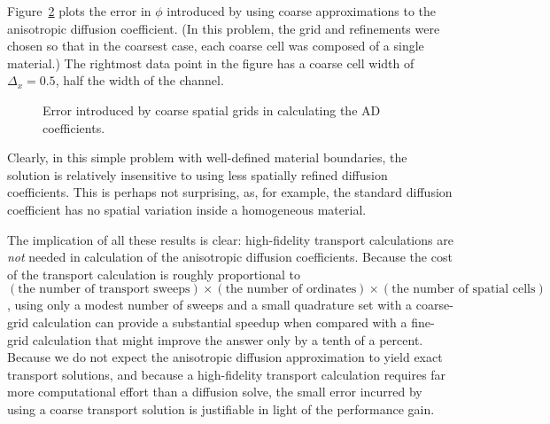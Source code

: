 \begin{figure}[htb]
  \centering
{}%
%
  \label{fig:ssSingleMgD}
\end{figure}

Figure~\ref{fig:ssSingleMgConv} plots the error in $\phi$ introduced by using
coarse approximations to the anisotropic diffusion coefficient. (In this
problem, the grid and refinements were chosen so that in the coarsest case, each
coarse cell was composed of a single material.) 
The rightmost data point in the figure has a coarse cell width of
$\Delta_x=0.5$, half the width of the channel.
\begin{figure}[htb]
  \centering
  
  \caption{Error introduced by coarse spatial grids in calculating the AD
  coefficients.}
  \label{fig:ssSingleMgConv}
\end{figure}
Clearly, in this simple problem with well-defined material boundaries, the
solution is relatively insensitive to using less spatially refined diffusion
coefficients. This is perhaps not surprising, as, for example, the standard
diffusion coefficient has no spatial variation inside a homogeneous material.

The implication of all these results is clear: high-fidelity transport
calculations are \emph{not} needed in calculation of the anisotropic diffusion
coefficients. Because the cost of the transport calculation is
roughly proportional to $
  (\text{the number of transport sweeps}) \times 
  (\text{the number of ordinates}) \times 
  (\text{the number of spatial cells})$,
using only a modest number of sweeps and a small quadrature set with a
coarse-grid calculation can provide a substantial speedup when compared with a
fine-grid calculation that might improve the answer only by a tenth of a
percent. Because we do not expect the anisotropic diffusion approximation to
yield exact transport solutions, and because a high-fidelity transport
calculation requires far more computational effort than a diffusion solve, the
small error incurred by using a coarse transport solution is justifiable in
light of the performance gain.

